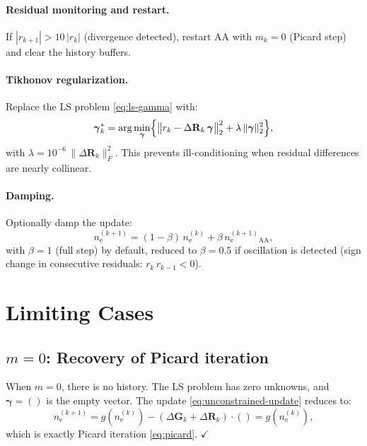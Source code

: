 \documentclass[11pt]{article}
\newcommand{\ne}{n_\mathrm{e}}
\newcommand{\bgamma}{\boldsymbol{\gamma}}
\newcommand{\DR}{\Delta\mathbf{R}}
\newcommand{\DG}{\Delta\mathbf{G}}
\begin{document}
\paragraph{Residual monitoring and restart.}
If $|r_{k+1}| > 10\,|r_k|$ (divergence detected), restart AA with
$m_k = 0$ (Picard step) and clear the history buffers.

\paragraph{Tikhonov regularization.}
Replace the LS problem \eqref{eq:ls-gamma} with:
%
\begin{equation}
  \label{eq:tikhonov}
  \bgamma_k^* = \arg\min_{\bgamma}
  \Bigl\{
    \bigl\|r_k - \DR_k\,\bgamma\bigr\|_2^2
    + \lambda\,\|\bgamma\|_2^2
  \Bigr\},
\end{equation}
%
with $\lambda = 10^{-6}\,\|\DR_k\|_F^2$.  This prevents ill-conditioning
when residual differences are nearly collinear.

\paragraph{Damping.}
Optionally damp the update:
%
\begin{equation}
  \label{eq:damping}
  \ne^{(k+1)} = (1-\beta)\,\ne^{(k)} + \beta\,\ne^{(k+1)}_\mathrm{AA},
\end{equation}
%
with $\beta = 1$ (full step) by default, reduced to $\beta = 0.5$ if
oscillation is detected (sign change in consecutive residuals:
$r_k\,r_{k-1} < 0$).


\section{Limiting Cases}
\label{sec:limits}

\subsection{$m = 0$: Recovery of Picard iteration}

When $m = 0$, there is no history.  The LS problem has zero unknowns,
and $\bgamma = ()$ is the empty vector.  The update
\eqref{eq:unconstrained-update} reduces to:
%
\begin{equation}
  \ne^{(k+1)} = g(\ne^{(k)}) - (\DG_k + \DR_k)\cdot()
              = g(\ne^{(k)}),
\end{equation}
%
which is exactly Picard iteration \eqref{eq:picard}. $\checkmark$
\end{document}
